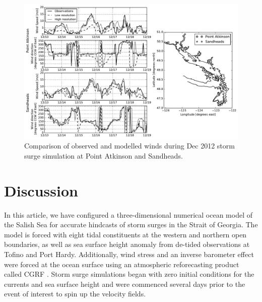 \documentclass[pdftex,10pt]{article}
\begin{document}
\begin{figure}
\centering
\includegraphics[scale=0.6]{Figures/dec2012_weather.pdf}
\caption{Comparison of observed and modelled winds during Dec 2012 storm surge simulation at Point Atkinson and Sandheads.}
\label{fig:dec2013_weather}
\end{figure}



\section{Discussion}\label{sec:diss}
In this article, we have configured a three-dimensional numerical ocean model of the Salish Sea for accurate hindcasts of storm surges in the Strait of Georgia. The model is forced with eight tidal constituents at the western and northern open boundaries, as well as sea surface height anomaly from de-tided observations at Tofino and Port Hardy. Additionally, wind stress and an inverse barometer effect were forced at the ocean surface using an atmospheric reforecasting product called CGRF \citep{smith2014new}. Storm surge simulations began with zero initial conditions for the currents and sea surface height and were commenced several days prior to the event of interest to spin up the velocity fields. 
\end{document}
